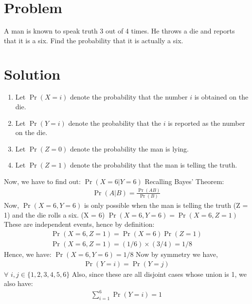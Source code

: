 \documentclass[journal,12pt,twocolumn]{IEEEtran}
\begin{document}
\section*{Problem}
A man is known to speak truth 3 out of 4 times. He throws a die and reports that it is a six. Find the probability that it is actually a six.
\section*{Solution}
\begin{enumerate}
    \item Let $\Pr(X=i)$ denote the probability that the number $i$ is obtained on the die.
    \item Let $\Pr(Y=i)$ denote the probability that the $i$ is reported as the number on the die.
    \item Let $\Pr(Z=0)$ denote the probability the man is lying.
    \item Let $\Pr(Z=1)$ denote the probability that the man is telling the truth.
\end{enumerate}
Now, we have to find out: $\Pr(X=6|Y=6)$
\newline \newline Recalling Bayes' Theorem:
\begin{align}
\Pr(A|B)=\frac{\Pr(AB)}{\Pr(B)} 
\label{Bayes}
\end{align}
Now, $\Pr(X=6, Y=6)$ is only possible when the man is telling the truth (Z = 1) and the die rolls a six. (X = 6)
\newline \newline $\Pr(X=6, Y=6)=\Pr(X=6, Z=1)$
\newline These are independent events, hence by definition:
\begin{align}
\Pr(X=6, Z=1)=\Pr(X=6)\Pr(Z=1) \\
\Pr(X=6, Z=1)=(1/6) \times (3/4)=1/8
\end{align}
Hence, we have: 
\newline $\Pr(X=6, Y=6)=1/8 $
\newline \newline Now by symmetry we have, 
\begin{align}
   \Pr(Y=i) = \Pr(Y=j)
   \label{equal}
\end{align}
$\forall$ $i,j \in \{ 1,2,3,4,5,6 \}$ 
\newline \newline Also, since these are all disjoint cases whose union is 1, we also have:
\begin{align}
    \sum_{i=1}^{6} \Pr(Y=i) = 1 
    \label{sum}
\end{align}
\end{document}
